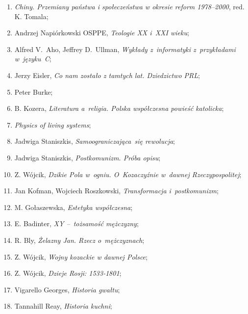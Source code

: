 \documentclass[a4paper,11pt]{article}
\begin{document}
\begin{enumerate}
\item \emph{Chiny. Przemiany państwa i społeczeństwa w okresie reform
    1978--2000}, red. K. Tomala;

\item Andrzej Napiórkowski OSPPE, \emph{Teologie XX i~XXI wieku};

\item Alfred V.~Aho, Jeffrey D.~Ullman, \emph{Wykłady z~informatyki
    z~przykładami w~języku~C};

\item Jerzy Eisler, \emph{Co nam zostało z tamtych lat. Dziedzictwo
    PRL};

\item Peter Burke;

\item B. Kozera, \emph{Literatura a~religia. Polska współczesna
    powieść katolicka};

\item \emph{Physics of living systems};

\item Jadwiga Staniszkis, \emph{Samoograniczająca~się rewolucja};

\item Jadwiga Staniszkis, \emph{Postkomunizm. Próba opisu};

\item Z. Wójcik, \emph{Dzikie Pola w~ogniu. O~Kozaczyźnie w~dawnej
    Rzeczypospolitej};

\item Jan Kofman, Wojciech Roszkowski, \emph{Transformacja
    i~postkomunizm};

\item M. Gołaszewska, \emph{Estetyka współczesna};

\item E. Badinter, \emph{XY --~tożsamość mężczyzny};

\item R. Bly, \emph{Żelazny Jan. Rzecz o~mężczyznach};

\item Z. Wójcik, \emph{Wojny kozackie w dawnej Polsce};

\item Z. Wójcik, \emph{Dzieje Rosji: 1533-1801};

\item Vigarello Georges, \emph{Historia gwałtu};

\item Tannahill Reay, \emph{Historia kuchni};


\end{enumerate}
\end{document}

